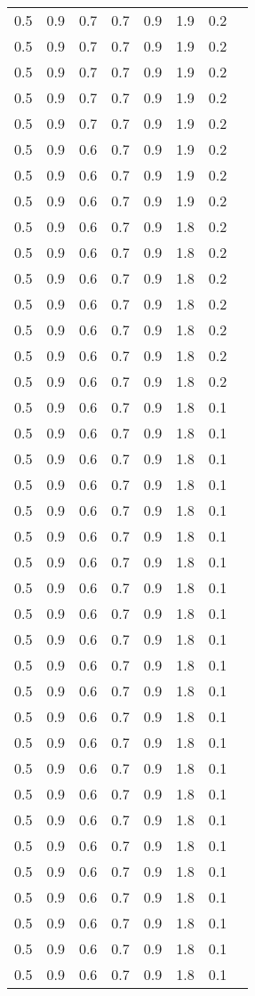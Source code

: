 \begin{tabular}{L{1in}|L{1in}|L{1in}|L{1in}|L{1in}|L{1in}|L{1in}|L{1in}}
0.5&0.9&0.7&0.7&0.9&1.9&0.2\\
0.5&0.9&0.7&0.7&0.9&1.9&0.2\\
0.5&0.9&0.7&0.7&0.9&1.9&0.2\\
0.5&0.9&0.7&0.7&0.9&1.9&0.2\\
0.5&0.9&0.7&0.7&0.9&1.9&0.2\\
0.5&0.9&0.6&0.7&0.9&1.9&0.2\\
0.5&0.9&0.6&0.7&0.9&1.9&0.2\\
0.5&0.9&0.6&0.7&0.9&1.9&0.2\\
0.5&0.9&0.6&0.7&0.9&1.8&0.2\\
0.5&0.9&0.6&0.7&0.9&1.8&0.2\\
0.5&0.9&0.6&0.7&0.9&1.8&0.2\\
0.5&0.9&0.6&0.7&0.9&1.8&0.2\\
0.5&0.9&0.6&0.7&0.9&1.8&0.2\\
0.5&0.9&0.6&0.7&0.9&1.8&0.2\\
0.5&0.9&0.6&0.7&0.9&1.8&0.2\\
0.5&0.9&0.6&0.7&0.9&1.8&0.1\\
0.5&0.9&0.6&0.7&0.9&1.8&0.1\\
0.5&0.9&0.6&0.7&0.9&1.8&0.1\\
0.5&0.9&0.6&0.7&0.9&1.8&0.1\\
0.5&0.9&0.6&0.7&0.9&1.8&0.1\\
0.5&0.9&0.6&0.7&0.9&1.8&0.1\\
0.5&0.9&0.6&0.7&0.9&1.8&0.1\\
0.5&0.9&0.6&0.7&0.9&1.8&0.1\\
0.5&0.9&0.6&0.7&0.9&1.8&0.1\\
0.5&0.9&0.6&0.7&0.9&1.8&0.1\\
0.5&0.9&0.6&0.7&0.9&1.8&0.1\\
0.5&0.9&0.6&0.7&0.9&1.8&0.1\\
0.5&0.9&0.6&0.7&0.9&1.8&0.1\\
0.5&0.9&0.6&0.7&0.9&1.8&0.1\\
0.5&0.9&0.6&0.7&0.9&1.8&0.1\\
0.5&0.9&0.6&0.7&0.9&1.8&0.1\\
0.5&0.9&0.6&0.7&0.9&1.8&0.1\\
0.5&0.9&0.6&0.7&0.9&1.8&0.1\\
0.5&0.9&0.6&0.7&0.9&1.8&0.1\\
0.5&0.9&0.6&0.7&0.9&1.8&0.1\\
0.5&0.9&0.6&0.7&0.9&1.8&0.1\\
0.5&0.9&0.6&0.7&0.9&1.8&0.1\\
0.5&0.9&0.6&0.7&0.9&1.8&0.1\\

\end{tabular}
